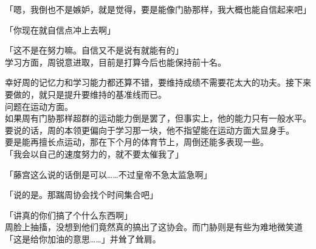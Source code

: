 「嗯，我倒也不是嫉妒，就是觉得，要是能像门胁那样，我大概也能自信起来吧」

「你现在就自信点冲上去啊」

「这不是在努力嘛。自信又不是说有就能有的」\\

学习方面，周锐意进取，目前是打算今后也能保持前十名。

幸好周的记忆力和学习能力都还算不错，要维持成绩不需要花太大的功夫。接下来要做的，就只是提升要维持的基准线而已。\\

问题在运动方面。\\

如果周有门胁那样超群的运动能力倒是罢了，但事实上，他的能力只有一般水平。要说的话，周的本领更偏向于学习那一块，他不指望能在运动方面大显身手。\\

要是能再擅长点运动，那在下个月的体育节上，周倒还能多表现一些。\\

「我会以自己的速度努力的，就不要太催我了」

「藤宫这么说的话倒是可以……不过皇帝不急太监急啊」

「说的是。那踹周协会找个时间集合吧」

「讲真的你们搞了个什么东西啊」\\

周脸上抽搐，没想到他们竟然真的搞出了这协会。而门胁则是有些为难地微笑道「这是给你加油的意思……」并耸了耸肩。

